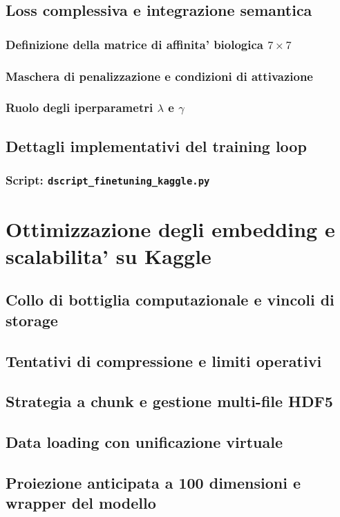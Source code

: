 \documentclass[12pt,a4paper,oneside]{report} %
\begin{document}
\section{Loss complessiva e integrazione semantica}
\subsection{Definizione della matrice di affinita' biologica $7 \times 7$}
\subsection{Maschera di penalizzazione e condizioni di attivazione}
\subsection{Ruolo degli iperparametri $\lambda$ e $\gamma$}
\section{Dettagli implementativi del training loop}
\subsection{Script: \texttt{dscript\_finetuning\_kaggle.py}}

\chapter{Ottimizzazione degli embedding e scalabilita' su Kaggle}
\section{Collo di bottiglia computazionale e vincoli di storage}
\section{Tentativi di compressione e limiti operativi}
\section{Strategia a chunk e gestione multi-file HDF5}
\section{Data loading con unificazione virtuale}
\section{Proiezione anticipata a 100 dimensioni e wrapper del modello}
\end{document}
